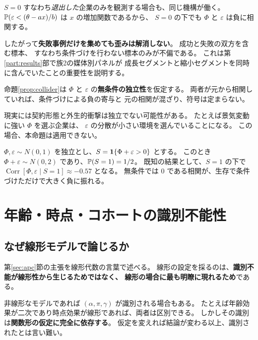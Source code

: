 \begin{remark}[逆向きの条件づけ]
\label{rem:collider-reverse}
$S=0$ すなわち\emph{退出した}企業のみを観測する場合も、同じ機構が働く。
$\mathbb{P}(\varepsilon<(\theta-ax)/b)$ は $x$ の増加関数であるから、
$S=0$ の下でも $\Phi$ と $\varepsilon$ は負に相関する。

したがって\textbf{失敗事例だけを集めても歪みは解消しない}。
成功と失敗の双方を含む標本、
すなわち条件づけを行わない標本のみが不偏である。
これは第\ref{part:results}部で族2の媒体別パネルが
成長セグメントと縮小セグメントを同時に含んでいたことの重要性を説明する。
\end{remark}

\begin{remark}[証明の限界]
\label{rem:collider-limit}
命題\ref{prop:collider}は $\Phi$ と $\varepsilon$ の\textbf{無条件の独立性}を仮定する。
両者が元から相関していれば、条件づけによる負の寄与と
元の相関が混ざり、符号は定まらない。

現実には契約形態と外生的衝撃は独立でない可能性がある。
たとえば景気変動に強い $\Phi$ を選ぶ企業は、
$\varepsilon$ の分散が小さい環境を選んでいることになる。
この場合、本命題は適用できない。
\end{remark}

\begin{example}[数値による確認]
$\Phi,\varepsilon\sim N(0,1)$ を独立とし、$S=\mathbf{1}\{\Phi+\varepsilon>0\}$ とする。
このとき $\Phi+\varepsilon\sim N(0,2)$ であり、$\mathbb{P}(S=1)=1/2$。
既知の結果として、$S=1$ の下で
$\operatorname{Corr}[\Phi,\varepsilon\mid S=1] \approx -0.57$ となる。
無条件では $0$ である相関が、生存で条件づけただけで大きく負に振れる。
\end{example}

\section{年齢・時点・コホートの識別不能性}

\subsection{なぜ線形モデルで論じるか}

第\ref{sec:apc}節の主張を線形代数の言葉で述べる。
線形の設定を採るのは、\textbf{識別不能が線形性から生じるためではなく、
線形の場合に最も明瞭に現れるため}である。

非線形なモデルであれば $(\alpha,\pi,\gamma)$ が識別される場合もある。
たとえば年齢効果が二次であり時点効果が線形であれば、両者は区別できる。
しかしその識別は\textbf{関数形の仮定に完全に依存する}。
仮定を変えれば結論が変わる以上、識別されたとは言い難い。

